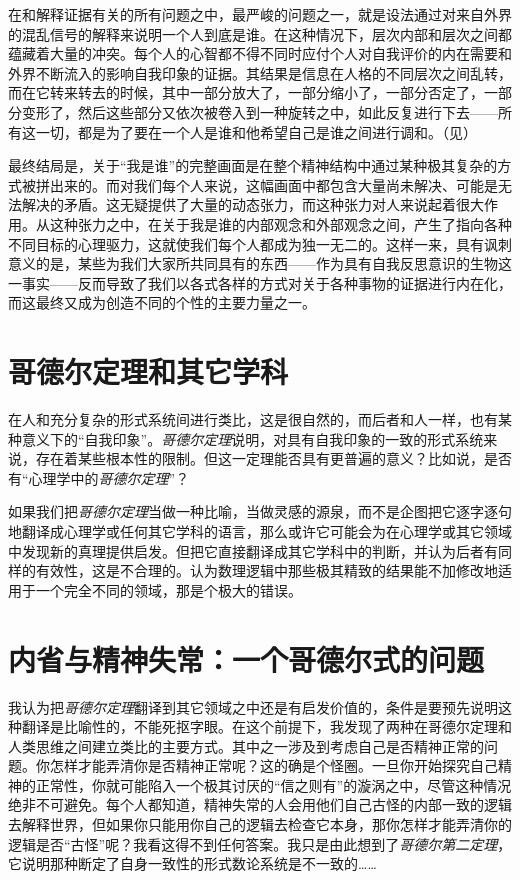 在和解释证据有关的所有问题之中，最严峻的问题之一，就是设法通过对来自外界的混乱信号的解释来说明一个人到底是谁。在这种情况下，层次内部和层次之间都蕴藏着大量的冲突。每个人的心智都不得不同时应付个人对自我评价的内在需要和外界不断流入的影响自我印象的证据。其结果是信息在人格的不同层次之间乱转，而在它转来转去的时候，其中一部分放大了，一部分缩小了，一部分否定了，一部分变形了，然后这些部分又依次被卷入到一种旋转之中，如此反复进行下去——所有这一切，都是为了要在一个人是谁和他希望自己是谁之间进行调和。（见）

最终结局是，关于“我是谁”的完整画面是在整个精神结构中通过某种极其复杂的方式被拼出来的。而对我们每个人来说，这幅画面中都包含大量尚未解决、可能是无法解决的矛盾。这无疑提供了大量的动态张力，而这种张力对人来说起着很大作用。从这种张力之中，在关于我是谁的内部观念和外部观念之间，产生了指向各种不同目标的心理驱力，这就使我们每个人都成为独一无二的。这样一来，具有讽刺意义的是，某些为我们大家所共同具有的东西——作为具有自我反思意识的生物这一事实——反而导致了我们以各式各样的方式对关于各种事物的证据进行内在化，而这最终又成为创造不同的个性的主要力量之一。

\section{哥德尔定理和其它学科}

在人和充分复杂的形式系统间进行类比，这是很自然的，而后者和人一样，也有某种意义下的“自我印象”。\emph{哥德尔定理}说明，对具有自我印象的一致的形式系统来说，存在着某些根本性的限制。但这一定理能否具有更普遍的意义？比如说，是否有“心理学中的\emph{哥德尔定理}”？

如果我们把\emph{哥德尔定理}当做一种比喻，当做灵感的源泉，而不是企图把它逐字逐句地翻译成心理学或任何其它学科的语言，那么或许它可能会为在心理学或其它领域中发现新的真理提供启发。但把它直接翻译成其它学科中的判断，并认为后者有同样的有效性，这是不合理的。认为数理逻辑中那些极其精致的结果能不加修改地适用于一个完全不同的领域，那是个极大的错误。

\section{内省与精神失常：一个哥德尔式的问题}

我认为把\emph{哥德尔定理}翻译到其它领域之中还是有启发价值的，条件是要预先说明这种翻译是比喻性的，不能死抠字眼。在这个前提下，我发现了两种在哥德尔定理和人类思维之间建立类比的主要方式。其中之一涉及到考虑自己是否精神正常的问题。你怎样才能弄清你是否精神正常呢？这的确是个怪圈。一旦你开始探究自己精神的正常性，你就可能陷入一个极其讨厌的“信之则有”的漩涡之中，尽管这种情况绝非不可避免。每个人都知道，精神失常的人会用他们自己古怪的内部一致的逻辑去解释世界，但如果你只能用你自己的逻辑去检查它本身，那你怎样才能弄清你的逻辑是否“古怪”呢？我看这得不到任何答案。我只是由此想到了\emph{哥德尔第二定理}，它说明那种断定了自身一致性的形式数论系统是不一致的……

